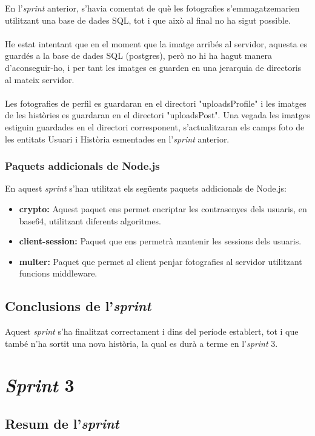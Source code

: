 \documentclass[11pt,catalan,listoffigures,listoftables]{tfgetsinf}
\begin{document}
En l'\textit{sprint} anterior, s'havia comentat de què les fotografies s'emmagatzemarien utilitzant una base de dades SQL, tot i que això al final no ha sigut possible.\\ \\
He estat intentant que en el moment que la imatge arribés al servidor, aquesta es guardés a la base de dades SQL (postgres), però no hi ha hagut manera d'aconseguir-ho, i per tant les imatges es guarden en una jerarquia de directoris al mateix servidor.\\ \\
Les fotografies de perfil es guardaran en el directori "uploadsProfile" i les imatges de les històries es guardaran en el directori "uploadsPost". Una vegada les imatges estiguin guardades en el directori corresponent, s'actualitzaran els camps foto de les entitats Usuari i Història esmentades en l'\textit{sprint} anterior.

\subsubsection{Paquets addicionals de Node.js}

En aquest \textit{sprint} s'han utilitzat els següents paquets addicionals de Node.js:
\begin{itemize}
\item \textbf{crypto:} Aquest paquet ens permet encriptar les contrasenyes dels usuaris, en base64, utilitzant diferents algoritmes.
\item \textbf{client-session:} Paquet que ens permetrà mantenir les sessions dels usuaris.
\item \textbf{multer:} Paquet que permet al client penjar fotografies al servidor utilitzant funcions middleware.
\end{itemize}

\subsection{Conclusions de l'\textit{sprint}}

Aquest \textit{sprint} s'ha finalitzat correctament i dins del període establert, tot i que també n'ha sortit una nova història, la qual es durà a terme en l'\textit{sprint} 3.

\section{\textit{Sprint} 3}

\subsection{Resum de l'\textit{sprint}}
\end{document}
